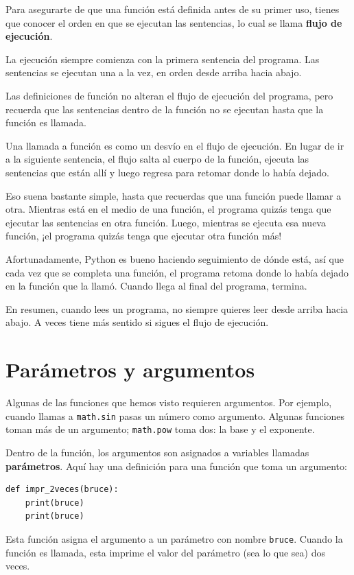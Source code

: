 \documentclass[10pt]{book}
\begin{document}
Para asegurarte de que una función está definida antes de su primer uso,
tienes que conocer el orden en que se ejecutan las sentencias, lo cual se
llama {\bf flujo de ejecución}.

La ejecución siempre comienza con la primera sentencia del programa.
Las sentencias se ejecutan una a la vez, en orden desde arriba hacia abajo.

Las definiciones de función no alteran el flujo de ejecución del
programa, pero recuerda que las sentencias dentro de la función no
se ejecutan hasta que la función es llamada.

Una llamada a función es como un desvío en el flujo de ejecución. En lugar de ir
a la siguiente sentencia, el flujo salta al cuerpo de
la función, ejecuta las sentencias que están allí y luego regresa
para retomar donde lo había dejado.

Eso suena bastante simple, hasta que recuerdas que una función puede
llamar a otra.  Mientras está en el medio de una función, el programa quizás
tenga que ejecutar las sentencias en otra función.  Luego, mientras
se ejecuta esa nueva función, ¡el programa quizás tenga que ejecutar
otra función más!

Afortunadamente, Python es bueno haciendo seguimiento de dónde está, así que cada
vez que se completa una función, el programa retoma donde lo había dejado en
la función que la llamó.  Cuando llega al final del programa,
termina.

En resumen, cuando lees un programa,
no siempre quieres leer desde arriba hacia abajo.  A veces tiene
más sentido si sigues el flujo de ejecución.


\section{Parámetros y argumentos}
\label{parameters}

Algunas de las funciones que hemos visto requieren argumentos. Por
ejemplo, cuando llamas a {\tt math.sin} pasas un número
como argumento.  Algunas funciones toman más de un argumento;
{\tt math.pow} toma dos: la base y el exponente.

Dentro de la función, los argumentos son asignados a
variables llamadas {\bf parámetros}.  Aquí hay una definición para
una función que toma un argumento:

\begin{verbatim}
def impr_2veces(bruce):
    print(bruce)
    print(bruce)
\end{verbatim}
%
Esta función asigna el argumento a un parámetro
con nombre {\tt bruce}.  Cuando la función es llamada, esta imprime el valor del
parámetro (sea lo que sea) dos veces.
\end{document}
